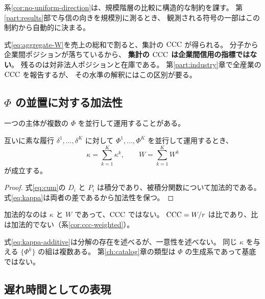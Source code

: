 系\ref{cor:no-uniform-direction}は、規模階層の比較に構造的な制約を課す。
第\ref{part:results}部で与信の向きを規模別に測るとき、
観測される符号の一部はこの制約から自動的に決まる。

\begin{remark}
式\eqref{eq:aggregate-W}を売上の総和で割ると、集計の $\mathrm{CCC}$ が得られる。
分子から企業間ポジションが落ちているから、
\textbf{集計の $\mathrm{CCC}$ は企業間信用の指標ではない}。
残るのは対非法人ポジションと在庫である。
第\ref{part:industry}章で全産業の $\mathrm{CCC}$ を報告するが、
その水準の解釈にはこの区別が要る。
\end{remark}

\subsection{$\Phi$ の並置に対する加法性}
\label{sec:kappa-additive}

一つの主体が複数の $\Phi$ を並行して運用することがある。

\begin{proposition}
\label{prop:kappa-additive}
互いに素な履行 $\delta^1,\dots,\delta^K$ に対して
$\Phi^1,\dots,\Phi^K$ を並行して運用するとき、
\begin{equation}
\kappa = \sum_{k=1}^{K}\kappa^{k},
\qquad
W = \sum_{k=1}^{K} W^{k}
\label{eq:kappa-additive}
\end{equation}
が成立する。
\end{proposition}

\begin{proof}
式\eqref{eq:cum}の $D_i$ と $P_i$ は積分であり、被積分関数について加法的である。
式\eqref{eq:kappa}は両者の差であるから加法性を保つ。
\end{proof}

加法的なのは $\kappa$ と $W$ であって、$\mathrm{CCC}$ ではない。
$\mathrm{CCC}=W/r$ は比であり、比は加法的でない（系\ref{cor:ccc-weighted}）。

\begin{remark}[分解は一意でない]
\label{rem:decomposition-not-unique}
式\eqref{eq:kappa-additive}は分解の存在を述べるが、一意性を述べない。
同じ $\kappa$ を与える $\{\Phi^k\}$ の組は複数ある。
第\ref{ch:catalog}章の類型は $\Phi$ の生成系であって基底ではない。
\end{remark}

\subsection{遅れ時間としての表現}
\label{sec:tau}

